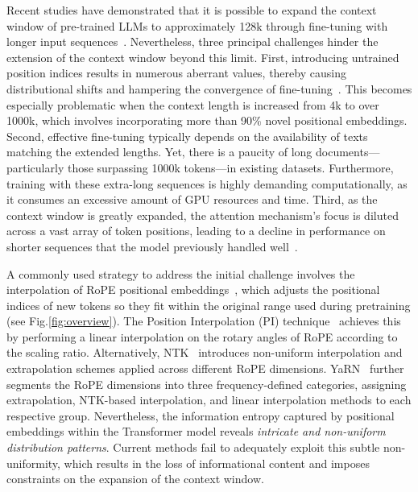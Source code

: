Recent studies have demonstrated that it is possible to expand the context window of pre-trained LLMs to approximately 128k through fine-tuning with longer input sequences~\cite{longlora,pi,yarn,zhang2024soaring,liu2023scaling}. Nevertheless, three principal challenges hinder the extension of the context window beyond this limit. First, introducing untrained position indices results in numerous aberrant values, thereby causing distributional shifts and hampering the convergence of fine-tuning~\cite{pi}. This becomes especially problematic when the context length is increased from 4k to over 1000k, which involves incorporating more than 90\% novel positional embeddings. Second, effective fine-tuning typically depends on the availability of texts matching the extended lengths. Yet, there is a paucity of long documents—particularly those surpassing 1000k tokens—in existing datasets. Furthermore, training with these extra-long sequences is highly demanding computationally, as it consumes an excessive amount of GPU resources and time. Third, as the context window is greatly expanded, the attention mechanism’s focus is diluted across a vast array of token positions, leading to a decline in performance on shorter sequences that the model previously handled well~\cite{pi}.

A commonly used strategy to address the initial challenge involves the interpolation of RoPE positional embeddings~\cite{rope,pi}, which adjusts the positional indices of new tokens so they fit within the original range used during pretraining (see Fig.\ref{fig:overview}). The Position Interpolation (PI) technique~\cite{pi} achieves this by performing a linear interpolation on the rotary angles of RoPE according to the scaling ratio. Alternatively, NTK~\cite{ntk,dynamicntk} introduces non-uniform interpolation and extrapolation schemes applied across different RoPE dimensions. YaRN~\cite{yarn} further segments the RoPE dimensions into three frequency-defined categories, assigning extrapolation, NTK-based interpolation, and linear interpolation methods to each respective group. Nevertheless, the information entropy captured by positional embeddings within the Transformer model reveals \emph{intricate and non-uniform distribution patterns}. Current methods fail to adequately exploit this subtle non-uniformity, which results in the loss of informational content and imposes constraints on the expansion of the context window.

